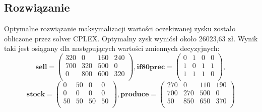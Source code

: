 \documentclass[11pt,a4paper]{article}
\begin{document}
\subsection{Rozwiązanie}
Optymalne rozwiązanie maksymalizacji wartości oczekiwanej zysku zostało obliczone przez solver CPLEX. Optymalny zysk wyniósł około 26023,63 zł. Wynik taki jest osiągany dla następujących wartości zmiennych decyzyjnych:
\begin{displaymath}
\mathbf{sell} = 
 \begin{pmatrix}
  320 & 0 & 160 & 240 \\
  700 & 320 & 500 & 0 \\ 
  0 & 800 & 600 & 320 \\  
 \end{pmatrix},
 \mathbf{if80prec} = 
 \begin{pmatrix}
  0 & 1 & 0 & 0 \\
  1 & 0 & 1 & 1 \\ 
  1 & 1 & 1 & 0 \\  
 \end{pmatrix},
\end{displaymath}
\begin{displaymath}
\mathbf{stock} = 
 \begin{pmatrix}
  0 & 50 & 0 & 0 \\
  0 & 0 & 0 & 0 \\ 
  50 & 50 & 50 & 50 \\  
 \end{pmatrix},
 \mathbf{produce} = 
 \begin{pmatrix}
  270 & 0 & 110 & 190 \\
  700 & 270 & 500 & 0 \\ 
  50 & 850 & 650 & 370 \\  
 \end{pmatrix} 
\end{displaymath}
\end{document}
